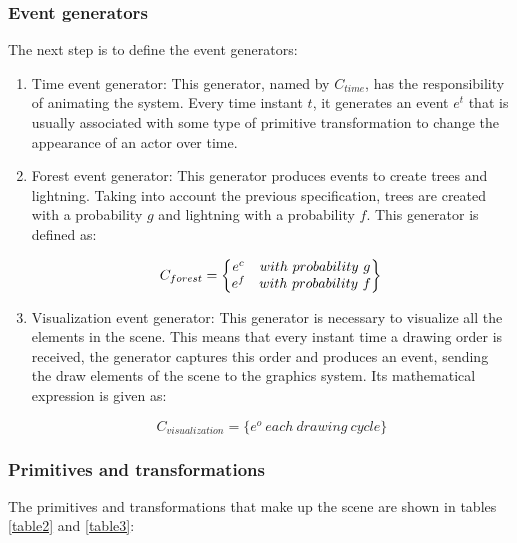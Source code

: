 \documentclass[10pt,journal,letterpaper,compsoc]{IEEEtran}
\begin{document}
\subsubsection{Event generators
\label{sec:generators}}

The next step is to define the event generators:

\begin{enumerate}

\item Time event generator:
This generator, named by $C_{time}$, has the responsibility of animating the system. Every time
instant $t$, it generates an event $e^t$ that is usually associated with some type of primitive
transformation to change the appearance of an actor over time.

\item Forest event generator:
This generator produces events to create trees and lightning. Taking into account the
previous specification, trees are created with a probability $g$ and lightning with a probability
$f$. This generator is defined as:

\[C_{forest}=
    \left\{
        \begin{matrix}
            e^{c} & with \ probability \ g \\
            e^{f} & with \ probability \ f
        \end{matrix}\right\}\\ \]

\item Visualization event generator:
This generator is necessary to visualize all the elements in the scene. This means that every
instant time a drawing order is received, the generator captures this order and produces an
event, sending the draw elements of the scene to the graphics system. Its mathematical expression
is given as:

\[C_{visualization} = \{ e^o \ \mathit{each \ drawing \ cycle} \} \]
\end{enumerate}



\subsubsection{Primitives and transformations
\label{sec:primitivesandtransf}}

The primitives and transformations that make up the scene are shown in tables \ref{table2} and
\ref{table3}:
\end{document}
